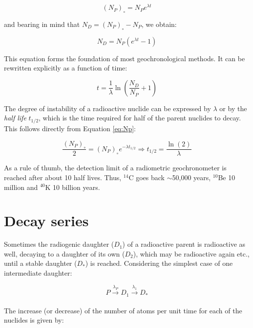 \documentclass{book}
\begin{document}
\begin{equation}
(N_P)_\circ = N_P e^{\lambda t}
\label{eq:Np0}
\end{equation}

and bearing in mind that $N_D = (N_P)_\circ - N_P$, we obtain:

\begin{equation}
N_D = N_P (e^{\lambda t}- 1)
\label{eq:Nd}
\end{equation}

This equation forms the foundation of most geochronological
methods. It can be rewritten explicitly as a function of time:

\begin{equation}
t = \frac{1}{\lambda} \ln\left(\frac{N_D}{N_P} + 1\right)
\label{eq:t}
\end{equation}

The degree of instability of a radioactive nuclide can be expressed by
$\lambda$ or by the \emph{half life} $t_{1/2}$, which is the time
required for half of the parent nuclides to decay. This follows
directly from Equation \ref{eq:Np}:

\begin{equation}
\frac{(N_P)_\circ}{2} = (N_P)_\circ e^{-\lambda t_{1/2}} 
\Rightarrow t_{1/2} = \frac{\ln(2)}{\lambda}
\label{eq:T12}
\end{equation}

As a rule of thumb, the detection limit of a radiometric
geo\-chro\-no\-me\-ter is reached after about 10 half lives. Thus,
$^{14}$C goes back $\sim$50,000 years, $^{10}$Be 10 million and
$^{40}$K 10 billion years.

\section{Decay series}
\label{sec:decay-series}

Sometimes the radiogenic daughter ($D_1$) of a radioactive parent is
radioactive as well, decaying to a daughter of its own ($D_2$), which
may be radioactive again etc., until a stable daughter ($D_*$) is
reached. Considering the simplest case of one intermediate daughter:

\begin{equation}
P \xrightarrow[]{\lambda_P} D_1 \xrightarrow[]{\lambda_1} D_*
\label{eq:series}
\end{equation}

The increase (or decrease) of the number of atoms per unit time for
each of the nuclides is given by:
\end{document}
